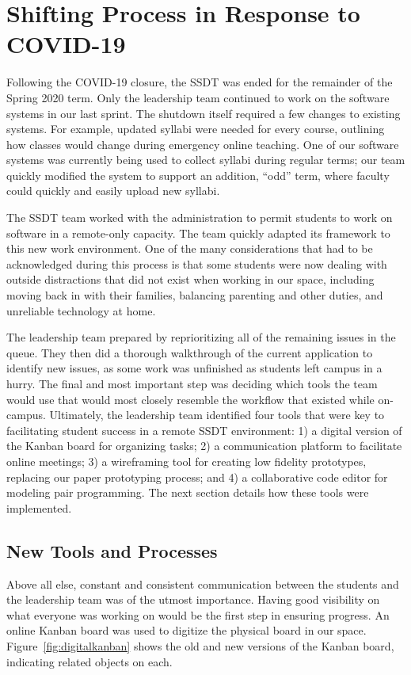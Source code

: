 \section{Shifting Process in Response to COVID-19}

Following the COVID-19 closure, the SSDT was ended for the remainder of the Spring 2020 term. Only the leadership team continued to work on the software systems in our last sprint. The shutdown itself required a few changes to existing systems. For example, updated syllabi were needed for every course, outlining how classes would change during emergency online teaching. One of our software systems was currently being used to collect syllabi during regular terms; our team quickly modified the system to support an addition, ``odd'' term, where faculty could quickly and easily upload new syllabi.

The SSDT team worked with the administration to permit students to work on software in a remote-only capacity. The team quickly adapted its framework to this new work environment. One of the many considerations that had to be acknowledged during this process is that some students were now dealing with outside distractions that did not exist when working in our space, including moving back in with their families, balancing parenting and other duties, and unreliable technology at home.

The leadership team prepared by reprioritizing all of the remaining issues in the queue. They then did a thorough walkthrough of the current application to identify new issues, as some work was unfinished as students left campus in a hurry. The final and most important step was deciding which tools the team would use that would most closely resemble the workflow that existed while on-campus. Ultimately, the leadership team identified four tools that were key to facilitating student success in a remote SSDT environment: 1) a digital version of the Kanban board for organizing tasks; 2) a communication platform to facilitate online meetings; 3) a wireframing tool for creating low fidelity prototypes, replacing our paper prototyping process; and 4) a collaborative code editor for modeling pair programming. The next section details how these tools were implemented.

\subsection{New Tools and Processes}
Above all else, constant and consistent communication between the students and the leadership team was of the utmost importance. Having good visibility on what everyone was working on would be the first step in ensuring progress. An online Kanban board was used to digitize the physical board in our space. Figure~\ref{fig:digitalkanban} shows the old and new versions of the Kanban board, indicating related objects on each.

